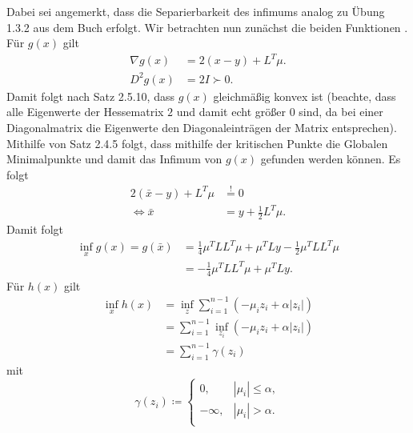 \documentclass[ngerman, a4paper,12pt]{article}
\begin{document}
Dabei sei angemerkt, dass die Separierbarkeit des infimums analog zu Übung 1.3.2 aus dem Buch erfolgt. Wir betrachten nun zunächst die beiden Funktionen .
Für $g(x)$ gilt
\begin{equation*}
	\begin{split}
		\nabla g(x) &= 2(x-y) + L^T\mu. \\
		D^2 g(x) &= 2 I \succ 0.
	\end{split}
\end{equation*}
Damit folgt nach Satz 2.5.10, dass $g(x)$ gleichmäßig konvex ist (beachte, dass alle Eigenwerte der Hessematrix $2$ und damit echt größer $0$ sind, da bei einer Diagonalmatrix die Eigenwerte den Diagonaleinträgen der Matrix entsprechen). Mithilfe von Satz 2.4.5 folgt, dass mithilfe der kritischen Punkte die Globalen Minimalpunkte und damit das Infimum von $g(x)$ gefunden werden können. Es folgt
\begin{equation*}
	\begin{split}
	  2( \bar{x}-y)+L^T\mu &\stackrel{!}{=}0 \\
	  \Leftrightarrow \bar{x}&=y+\frac{1}{2} L^T\mu.
	\end{split}
\end{equation*}
Damit folgt 
\begin{equation*}
	\begin{split}
		\inf_x g(x) = g( \bar{x} ) &=\frac{1}{4}\mu^TLL^T\mu+\mu^TLy-\frac{1}{2}\mu^TLL^T\mu \\ &=-\frac{1}{4}\mu^TLL^T\mu+\mu^TLy.
	\end{split}
\end{equation*}
Für $h(x)$ gilt
\begin{equation*}
	\begin{split}
		\inf_x h(x)&=\inf_z \sum_{i=1}^{n-1}( -\mu_iz_i+\alpha|z_i|) \\
		  &= \sum_{i=1}^{n-1} \inf_{z_i} (-\mu_iz_i+\alpha|z_i|) \\
		  &= \sum_{i=1}^{n-1} \gamma (z_i)
		  \end{split}
\end{equation*}
mit 
\begin{equation*}
\gamma(z_i) \coloneqq \begin{cases}
	0,& |\mu_i|\leq \alpha,\\
	-\infty,& |\mu_i|>\alpha.\\
\end{cases}
\end{equation*}
\end{document}
